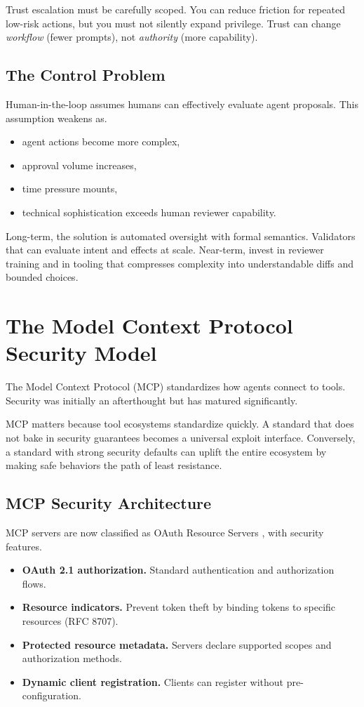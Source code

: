 Trust escalation must be carefully scoped. You can reduce friction for repeated low-risk actions, but you must not silently expand privilege. Trust can change \emph{workflow} (fewer prompts), not \emph{authority} (more capability).

\subsection{The Control Problem}

Human-in-the-loop assumes humans can effectively evaluate agent proposals. This assumption weakens as.
\begin{itemize}
\item agent actions become more complex,
\item approval volume increases,
\item time pressure mounts,
\item technical sophistication exceeds human reviewer capability.
\end{itemize}

Long-term, the solution is automated oversight with formal semantics. Validators that can evaluate intent and effects at scale. Near-term, invest in reviewer training and in tooling that compresses complexity into understandable diffs and bounded choices.

\section{The Model Context Protocol Security Model}

The Model Context Protocol (MCP) \cite{mcp2025} standardizes how agents connect to tools. Security was initially an afterthought but has matured significantly.

MCP matters because tool ecosystems standardize quickly. A standard that does not bake in security guarantees becomes a universal exploit interface. Conversely, a standard with strong security defaults can uplift the entire ecosystem by making safe behaviors the path of least resistance.

\subsection{MCP Security Architecture}

MCP servers are now classified as OAuth Resource Servers \cite{mcpauth2025}, with security features.
\begin{itemize}
\item \textbf{OAuth 2.1 authorization.} Standard authentication and authorization flows.
\item \textbf{Resource indicators.} Prevent token theft by binding tokens to specific resources (RFC 8707).
\item \textbf{Protected resource metadata.} Servers declare supported scopes and authorization methods.
\item \textbf{Dynamic client registration.} Clients can register without pre-configuration.
\end{itemize}

